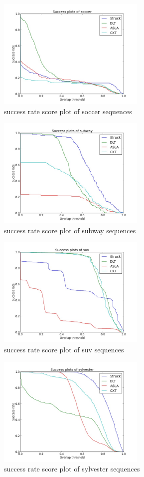 \documentclass{acm_proc_article-sp}
\begin{document}
\begin{figure}[hbt]
    \includegraphics[width=200pt]{soccer.jpg}
    \caption{success rate score plot of soccer sequences}
    \label{fig:soccer}
\end{figure}

\begin{figure}[hbt]
    \includegraphics[width=200pt]{subway.jpg}
    \caption{success rate score plot of subway sequences}
    \label{fig:subway}
\end{figure}

\begin{figure}[hbt]
    \includegraphics[width=200pt]{suv.jpg}
    \caption{success rate score plot of suv sequences}
    \label{fig:suv}
\end{figure}

\begin{figure}[hbt]
    \includegraphics[width=200pt]{sylvester.jpg}
    \caption{success rate score plot of sylvester sequences}
    \label{fig:sylvester}
\end{figure}
\end{document}

